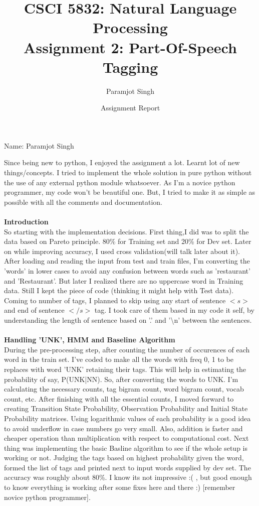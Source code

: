 \documentclass[addpoints,12pt]{exam}
\title{CSCI 5832: Natural Language Processing\\Assignment 2: Part-Of-Speech Tagging}
\date{Assignment Report}
\author{Paramjot Singh}
\begin{document}
\maketitle

\pagestyle{headandfoot}
\runningheadrule
{}
              {}
              {Name: Paramjot Singh}
              \firstpagefooter{}{}{}
              \runningfooter{}{}{}

Since being new to python, I enjoyed the assignment a lot. Learnt lot of new things/concepts. I tried to implement the whole solution in pure python without the use of any external python module whatsoever. As I'm a novice python programmer, my code won't be beautiful one. But, I tried to make it as simple as possible with all the comments and documentation.\\
\\
\textbf{Introduction}\\
So starting with the implementation decisions. First thing,I did was to split the data based on Pareto principle. 80\% for Training set and 20\% for Dev set. Later on while improving accuracy, I used cross validation(will talk later about it).
After loading and reading the input from test and train files, I'm converting the 'words' in lower cases to avoid any confusion between words such as 'restaurant' and 'Restaurant'. But later I realized there are no uppercase word in Training data. Still I kept the piece of code (thinking it might help with Test data). Coming to number of tags, I planned to skip using any start of sentence $<s>$ and end of sentence $</s>$ tag. I took care of them based in my code it self, by understanding the length of sentence based on '.' and '\textbackslash n' between the sentences. 
\\ \\
\textbf{Handling 'UNK', HMM and Baseline Algorithm}\\
During the pre-processing step, after counting the number of occurences of each word in the train set. I've coded to make all the words with freq 0, 1 to be replaces with word 'UNK' retaining their tags. This will help in estimating the probability of say, P(UNK|NN). So, after converting the words to UNK. I'm calculating the necessary counts, tag bigram count, word bigram count, vocab count, etc.
After finishing with all the essential counts, I moved forward to creating Transition State Probability, Observation Probability and Initial State Probability matrices. Using logarithmic values of each probability is a good idea to avoid underflow in case numbers go very small. Also, addition is faster and cheaper operation than multiplication with respect to computational cost. Next thing was implementing the basic Basline algorithm to see if the whole setup is working or not. Judging the tags based on highest probability given the word, formed the list of tags and printed next to input words supplied by dev set. The accuracy was roughly about 80\%. I know its not impressive :( , but good enough to know everything is working after some fixes here and there :) [remember novice python programmer].\\ \\
\end{document}
